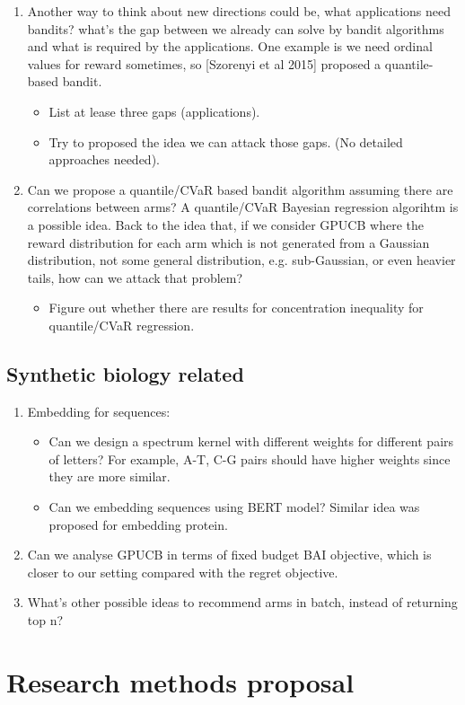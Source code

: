 \begin{enumerate}
    \item Another way to think about new directions could be, what applications need bandits? what's the gap between we already can solve by bandit algorithms and what is required by the applications. One example is we need ordinal values for reward sometimes, so [Szorenyi et al 2015] proposed a quantile-based bandit. 
    \begin{itemize}
        \item List at lease three gaps (applications).
        \item Try to proposed the idea we can attack those gaps. (No detailed approaches needed).
    \end{itemize}
    
    \item Can we propose a quantile/CVaR based bandit algorithm assuming there are correlations between arms? A quantile/CVaR Bayesian regression algorihtm is a possible idea. Back to the idea that, if we consider GPUCB where the reward distribution for each arm which is not generated from a Gaussian distribution, not some general distribution, e.g. sub-Gaussian, or even heavier tails, how can we attack that problem?
    \begin{itemize}
        \item Figure out whether there are results for concentration inequality for quantile/CVaR regression. 
    \end{itemize}
    
\end{enumerate}

\subsection{Synthetic biology related}

\begin{enumerate}
    \item Embedding for sequences:
        \begin{itemize}
            \item Can we design a spectrum kernel with different weights for different pairs of letters? For example, A-T, C-G pairs should have higher weights since they are more similar. 
            
            \item Can we embedding sequences using BERT model? Similar idea was proposed for embedding protein. 
        \end{itemize}
    \item Can we analyse GPUCB in terms of fixed budget BAI objective, which is closer to our setting compared with the regret objective.
    \item What's other possible ideas to recommend arms in batch, instead of returning top n?
\end{enumerate}

\section{Research methods proposal}